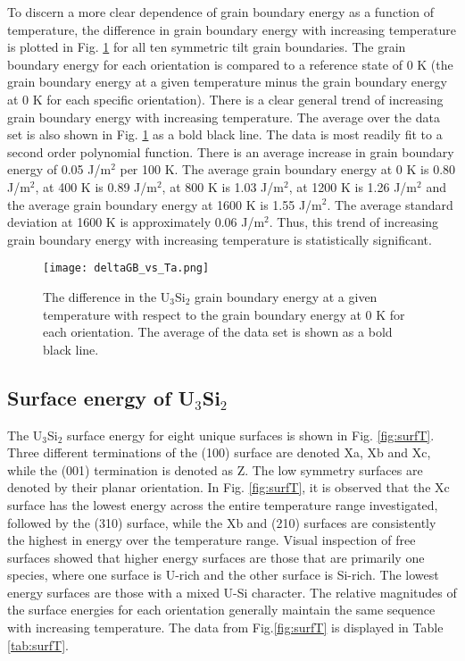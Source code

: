 \documentclass[review]{elsarticle}
\begin{document}
\FloatBarrier

To discern a more clear dependence of grain boundary energy as a function of temperature, the difference in grain boundary energy with increasing temperature is plotted in Fig. \ref{fig:gbdeltaT} for all ten symmetric tilt grain boundaries. The grain boundary energy for each orientation is compared to a reference state of 0 K (the grain boundary energy at a given temperature minus the grain boundary energy at 0 K for each specific orientation). There is a clear general trend of increasing grain boundary energy with increasing temperature. The average over the data set is also shown in Fig. \ref{fig:gbdeltaT} as a bold black line. The data is most readily fit to a second order polynomial function. There is an average increase in grain boundary energy of 0.05 J/m$^{2}$ per 100 K. The average grain boundary energy at 0 K is 0.80 J/m$^{2}$, at 400 K is 0.89 J/m$^{2}$, at 800 K is 1.03 J/m$^{2}$, at 1200 K is 1.26 J/m$^{2}$ and the average grain boundary energy at 1600 K is 1.55 J/m$^{2}$. The average standard deviation at 1600 K is approximately 0.06 J/m$^{2}$. Thus, this trend of increasing grain boundary energy with increasing temperature is statistically significant.
 
 \begin{figure}[h]
 \centering
 \texttt{[image: deltaGB\_vs\_Ta.png]} 
 \caption{The difference in the U$_{3}$Si$_{2}$ grain boundary energy at a given temperature with respect to the grain boundary energy at 0 K for each orientation. The average of the data set is shown as a bold black line. }
 \label{fig:gbdeltaT}
\end{figure}


\FloatBarrier

\subsection{Surface energy of U$_{3}$Si$_{2}$}

The U$_{3}$Si$_{2}$ surface energy for eight unique surfaces is shown in Fig. \ref{fig:surfT}. Three different terminations of the (100) surface are denoted Xa, Xb and Xc, while the (001) termination is denoted as Z. The low symmetry surfaces are denoted by their planar orientation. In Fig. \ref{fig:surfT}, it is observed that the Xc surface has the lowest energy across the entire temperature range investigated, followed by the (310) surface, while the Xb and (210) surfaces are consistently the highest in energy over the temperature range. Visual inspection of free surfaces showed that higher energy surfaces are those that are primarily one species, where one surface is U-rich and the other surface is Si-rich. The lowest energy surfaces are those with a mixed U-Si character. The relative magnitudes of the surface energies for each orientation generally maintain the same sequence with increasing temperature. The data from Fig.\ref{fig:surfT} is displayed in Table \ref{tab:surfT}.
\end{document}
